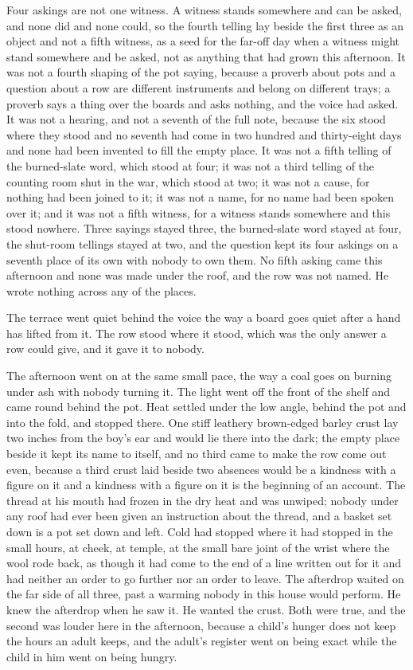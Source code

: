 Four askings are not one witness. A witness stands somewhere and can be asked, and none did and none could, so the fourth telling lay beside the first three as an object and not a fifth witness, as a seed for the far-off day when a witness might stand somewhere and be asked, not as anything that had grown this afternoon. It was not a fourth shaping of the pot saying, because a proverb about pots and a question about a row are different instruments and belong on different trays; a proverb says a thing over the boards and asks nothing, and the voice had asked. It was not a hearing, and not a seventh of the full note, because the six stood where they stood and no seventh had come in two hundred and thirty-eight days and none had been invented to fill the empty place. It was not a fifth telling of the burned-slate word, which stood at four; it was not a third telling of the counting room shut in the war, which stood at two; it was not a cause, for nothing had been joined to it; it was not a name, for no name had been spoken over it; and it was not a fifth witness, for a witness stands somewhere and this stood nowhere. Three sayings stayed three, the burned-slate word stayed at four, the shut-room tellings stayed at two, and the question kept its four askings on a seventh place of its own with nobody to own them. No fifth asking came this afternoon and none was made under the roof, and the row was not named. He wrote nothing across any of the places.

The terrace went quiet behind the voice the way a board goes quiet after a hand has lifted from it. The row stood where it stood, which was the only answer a row could give, and it gave it to nobody.

\scenebreak

The afternoon went on at the same small pace, the way a coal goes on burning under ash with nobody turning it. The light went off the front of the shelf and came round behind the pot. Heat settled under the low angle, behind the pot and into the fold, and stopped there. One stiff leathery brown-edged barley crust lay two inches from the boy's ear and would lie there into the dark; the empty place beside it kept its name to itself, and no third came to make the row come out even, because a third crust laid beside two absences would be a kindness with a figure on it and a kindness with a figure on it is the beginning of an account. The thread at his mouth had frozen in the dry heat and was unwiped; nobody under any roof had ever been given an instruction about the thread, and a basket set down is a pot set down and left. Cold had stopped where it had stopped in the small hours, at cheek, at temple, at the small bare joint of the wrist where the wool rode back, as though it had come to the end of a line written out for it and had neither an order to go further nor an order to leave. The afterdrop waited on the far side of all three, past a warming nobody in this house would perform. He knew the afterdrop when he saw it. He wanted the crust. Both were true, and the second was louder here in the afternoon, because a child's hunger does not keep the hours an adult keeps, and the adult's register went on being exact while the child in him went on being hungry.


